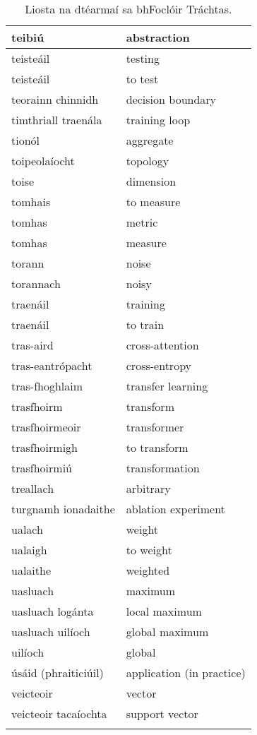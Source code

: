 \begin{longtable}{|l|l|}
		teibiú&abstraction\\ \hline 
		teisteáil&testing\\ \hline 
		teisteáil&to test\\ \hline 
		teorainn chinnidh&decision boundary\\ \hline 
		timthriall traenála&training loop\\ \hline 
		tionól&aggregate\\ \hline 
		toipeolaíocht&topology\\ \hline 
		toise&dimension\\ \hline 
		tomhais&to measure\\ \hline 
		tomhas&metric\\ \hline 
		tomhas&measure\\ \hline 
		torann&noise\\ \hline 
		torannach&noisy\\ \hline 
		traenáil&training\\ \hline 
		traenáil&to train\\ \hline 
		tras-aird&cross-attention\\ \hline 
		tras-eantrópacht&cross-entropy\\ \hline 
		tras-fhoghlaim&transfer learning\\ \hline 
		trasfhoirm&transform\\ \hline 
		trasfhoirmeoir&transformer\\ \hline 
		trasfhoirmigh&to transform\\ \hline 
		trasfhoirmiú&transformation\\ \hline 
		treallach&arbitrary\\ \hline 
		turgnamh ionadaithe&ablation experiment\\ \hline 
		ualach&weight\\ \hline 
		ualaigh&to weight\\ \hline 
		ualaithe&weighted\\ \hline 
		uasluach&maximum\\ \hline 
		uasluach logánta&local maximum\\ \hline 
		uasluach uilíoch&global maximum\\ \hline 
		uilíoch&global\\ \hline 
		úsáid (phraiticiúil)&application (in practice)\\ \hline 
		veicteoir&vector\\ \hline 
		veicteoir tacaíochta&support vector\\ \hline 
\caption{Liosta na dtéarmaí sa bhFoclóir Tráchtas.}
\label{tab-terms}
\end{longtable}


